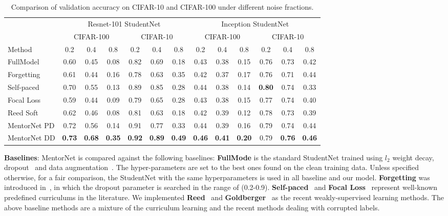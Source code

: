 \documentclass{article}
\begin{document}
\begin{table*}[ht]
\vspace{-4mm}
\centering
\caption{Comparison of validation accuracy on CIFAR-10 and CIFAR-100 under different noise fractions.}
\label{tab:cifar_comparison}
\begin{tabular}{|l|ccc|ccc|ccc|ccc|}
\hline
                & \multicolumn{6}{c|}{Resnet-101 StudentNet}  & \multicolumn{6}{c|}{Inception StudentNet}\\
                & \multicolumn{3}{c|}{CIFAR-100} & \multicolumn{3}{c|}{CIFAR-10} & \multicolumn{3}{c|}{CIFAR-100} & \multicolumn{3}{c|}{CIFAR-10} \\
Method & 0.2      & 0.4     & 0.8     & 0.2      & 0.4      & 0.8     & 0.2      & 0.4     & 0.8     & 0.2      & 0.4      & 0.8     \\
\hline
FullModel&0.60 & 0.45 & 0.08 &0.82 & 0.69 & 0.18 & 0.43 & 0.38 & 0.15 & 0.76 & 0.73 & 0.42\\
Forgetting&0.61&0.44&0.16&0.78&0.63&0.35&0.42&0.37&0.17&0.76&0.71&0.44\\
Self-paced& 0.70 & 0.55  &0.13 & 0.89&0.85&0.28 &0.44&0.38&0.14&\textbf{0.80}&0.74&0.33 \\     
Focal Loss&0.59&0.44&0.09&0.79&0.65&0.28&0.43&0.38&0.15&0.77&0.74&0.40 \\
Reed Soft&0.62&0.46&0.08&0.81&0.63&0.18&0.42&0.39&0.12&0.78&0.73&0.39\\
MentorNet PD &0.72&0.56&0.14&0.91&0.77&0.33&0.44&0.39&0.16&0.79&0.74&0.44\\
MentorNet DD &\textbf{0.73}& \textbf{0.68}  & \textbf{0.35} &  \textbf{0.92} & \textbf{0.89} &\textbf{0.49} &\textbf{0.46}& \textbf{0.41}&\textbf{0.20}&0.79&\textbf{0.76}&\textbf{0.46}\\
\hline
\end{tabular}
\vspace{-4mm}
\end{table*}


\noindent \textbf{Baselines}: MentorNet is compared against the following baselines: \textbf{FullMode} is the standard StudentNet trained using $l_2$ weight decay, dropout~\cite{srivastava2014dropout} and data augmentation~\cite{krizhevsky2012imagenet}. The hyper-parameters are set to the best ones found on the clean training data. Unless specified otherwise, for a fair comparison, the StudentNet with the same hyperparameters is used in all baseline and our model. \textbf{Forgetting} was introduced in~\cite{arpit2017closer}, in which the dropout parameter is searched in the range of (0.2-0.9). \textbf{Self-paced}~\cite{kumar2010self} and \textbf{Focal Loss}~\cite{lin2017focal} represent well-known predefined curriculums in the literature. We implemented \textbf{Reed}~ and \textbf{Goldberger}~\cite{goldberger2017training} as the recent weakly-supervised learning methods. The above baseline methods are a mixture of the curriculum learning and the recent methods dealing with corrupted labels.
 
\end{document}
